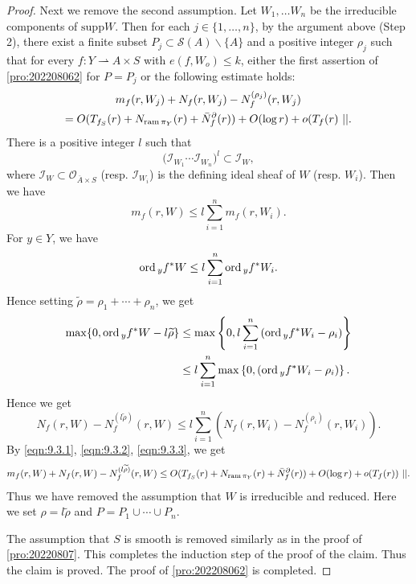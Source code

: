\documentclass[11pt,english]{smfart}
\theoremstyle{plain}
\theoremstyle{definition}
\theoremstyle{remark}
\numberwithin{equation}{section}
\theoremstyle{plain}
\newcommand{\da}{\rightharpoonup}
\newcommand{\pN}[1]{\bar{N}_{#1}^{\partial}}
\newcommand{\ord}{{\rm ord}\,}
\newcommand{\ram}{{\rm ram}\,}
\begin{document}
\begin{proof}
		Next we remove the second assumption.
		Let $W_1,\ldots W_n$ be the irreducible components of $\mathrm{supp} W$.
		Then for each $j\in \{1,\ldots,n\}$, by the argument above (Step 2), there exist a finite subset $P_{j}\subset \mathcal{S}(A)\backslash \{A\}$ and a positive integer $\rho_{j}$ such that for every $f:Y\da A\times S$ with $e(f,W_o)\leq k$, either the first assertion of \cref{pro:202208062} for $P=P_{j}$ or the following estimate holds:
		\begin{multline}\label{eqn:9.3.1}
			m_f(r,W_j)+N_f(r,W_j)-N^{(\rho _{j})}_f(r,W_j)
			\\
			=O(T_{f_S}(r)+N_{\ram \pi _Y}(r)+\pN{f}(r))+O(\log r)+o( T_f(r)\ ||.
		\end{multline}
		There is a positive integer $l$ such that
		$$\big( \mathcal I_{W_1}\cdots \mathcal I_{W_n}\big) ^l\subset \mathcal I_W,
		$$
		where $\mathcal I_W\subset \mathcal O_{\overline{A}\times S}$ (resp. $\mathcal I_{W_i}$) is the defining ideal sheaf of $W$ (resp. $W_i$).
		Then we have
		\begin{equation}\label{eqn:9.3.2}
			m_f(r,W)\leq l\sum_{i=1}^nm_f(r,W_i).
		\end{equation}
		For $y\in Y$, we have
		$$\ord _yf^*W\leq l\sum_{i=1}^n\ord _yf^*W_i.$$
		Hence setting $\widetilde{\rho}=\rho _{1}+\cdots +\rho _{n}$, we get
		\begin{equation*}
			\begin{split}
				\max \{ 0,\ord _yf^*W-l\widetilde{\rho} \}&\leq \max \left\{ 0,l\sum_{i=1}^n\left( \ord _yf^*W_i-\rho _{i}\right) \right\}\\
				&\leq l\sum_{i=1}^n\max \left\{ 0,\left( \ord _yf^*W_i-\rho _{i}\right) \right\} .
			\end{split}
		\end{equation*}
		Hence we get
		\begin{equation}\label{eqn:9.3.3}
			N_f(r,W)-N^{(l\widetilde{\rho})}_f(r,W)\leq  l\sum_{i=1}^n\left( N_f(r,W_i)-N^{(\rho _{i})}_f(r,W_i)\right) .
		\end{equation}
		By \eqref{eqn:9.3.1}, \eqref{eqn:9.3.2}, \eqref{eqn:9.3.3}, we get
		\begin{equation*}
			m_f(r,W)+N_f(r,W)-N^{(l\widetilde{\rho})}_f(r,W) \\
			\leq O(T_{f_S}(r)+N_{\ram\pi _Y}(r)+\pN{f}(r))+O(\log r)+o(T_f(r))\ ||.
		\end{equation*}
		Thus we have removed the assumption that $W$ is irreducible and reduced.
		Here we set $\rho=l\widetilde{\rho}$ and $P=P_{1}\cup\cdots\cup P_{n}$.
		
		The assumption that $S$ is smooth is removed similarly as in the proof of \cref{pro:20220807}.
		This completes the induction step of the proof of the claim.
		Thus the claim is proved.
		The proof of \cref{pro:202208062} is completed.
	\end{proof}
	
\end{document}
